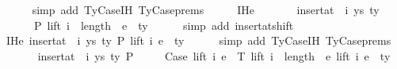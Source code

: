 \begin{isabellebody}
\ \ \ \ \isamarkupfalse%
\ {\isacharparenleft}{\kern0pt}simp\ add{\isacharcolon}{\kern0pt}\ TyCase{\isachardot}{\kern0pt}IH{\isacharparenleft}{\kern0pt}{}{\isacharparenright}{\kern0pt}\ TyCase{\isachardot}{\kern0pt}prems{\isacharparenright}{\kern0pt}\isanewline
\ \ \isamarkupfalse%
\ \isamarkupfalse%
\ IHe{}{\isacharcolon}{\kern0pt}\isanewline
\ \ \ \ \ {\isachardoublequoteopen}{\isasymGamma}{}\ {\isacharat}{\kern0pt}\ insert{\isacharunderscore}{\kern0pt}at\ {\isasymGamma}\ i\ {\isacharparenleft}{\kern0pt}ys{\isacharcomma}{\kern0pt}\ ty{}{\isacharparenright}{\kern0pt}\isanewline
\ \ \ \ \ \ {\isasymturnstile}{\isacharbraceleft}{\kern0pt}P{\isacharbraceright}{\kern0pt}\ lift\ {\isacharparenleft}{\kern0pt}i\ {\isacharplus}{\kern0pt}\ length\ {\isasymGamma}{}{\isacharparenright}{\kern0pt}\ e{}\ {\isacharcolon}{\kern0pt}\ ty{}{\isacharprime}{\kern0pt}{\isachardoublequoteclose}\isanewline
\ \ \ \ \isamarkupfalse%
\ {\isacharparenleft}{\kern0pt}simp\ add{\isacharcolon}{\kern0pt}\ insert{\isacharunderscore}{\kern0pt}at{\isacharunderscore}{\kern0pt}shift{\isacharparenright}{\kern0pt}\isanewline
\isanewline
\ \ \isamarkupfalse%
\ IHe{}{\isacharcolon}{\kern0pt}\ {\isachardoublequoteopen}insert{\isacharunderscore}{\kern0pt}at\ {\isasymGamma}\ i\ {\isacharparenleft}{\kern0pt}ys{\isacharcomma}{\kern0pt}\ ty{}{\isacharparenright}{\kern0pt}\ {\isasymturnstile}{\isacharbraceleft}{\kern0pt}P{\isacharbraceright}{\kern0pt}\ lift\ i\ e{}\ {\isacharcolon}{\kern0pt}\ ty{}{\isacharprime}{\kern0pt}{\isachardoublequoteclose}\isanewline
\ \ \ \ \isamarkupfalse%
\ {\isacharparenleft}{\kern0pt}simp\ add{\isacharcolon}{\kern0pt}\ TyCase{\isachardot}{\kern0pt}IH{\isacharparenleft}{\kern0pt}{}{\isacharparenright}{\kern0pt}\ TyCase{\isachardot}{\kern0pt}prems{\isacharparenright}{\kern0pt}\isanewline
\isanewline
\ \ \isamarkupfalse%
\isanewline
\ \ \ \ {\isachardoublequoteopen}insert{\isacharunderscore}{\kern0pt}at\ {\isasymGamma}\ i\ {\isacharparenleft}{\kern0pt}ys{\isacharcomma}{\kern0pt}\ ty{}{\isacharparenright}{\kern0pt}\ {\isasymturnstile}{\isacharbraceleft}{\kern0pt}P{\isacharbraceright}{\kern0pt}\isanewline
\ \ \ \ \ Case\ {\isacharparenleft}{\kern0pt}lift\ i\ e{}{\isacharparenright}{\kern0pt}\ {\isasymGamma}{}\ T\ {\isacharparenleft}{\kern0pt}lift\ {\isacharparenleft}{\kern0pt}i\ {\isacharplus}{\kern0pt}\ length\ {\isasymGamma}{}{\isacharparenright}{\kern0pt}\ e{}{\isacharparenright}{\kern0pt}\ {\isacharparenleft}{\kern0pt}lift\ i\ e{}{\isacharparenright}{\kern0pt}\ {\isacharcolon}{\kern0pt}\ ty{}{\isacharprime}{\kern0pt}{\isachardoublequoteclose}\isanewline

\end{isabellebody}
